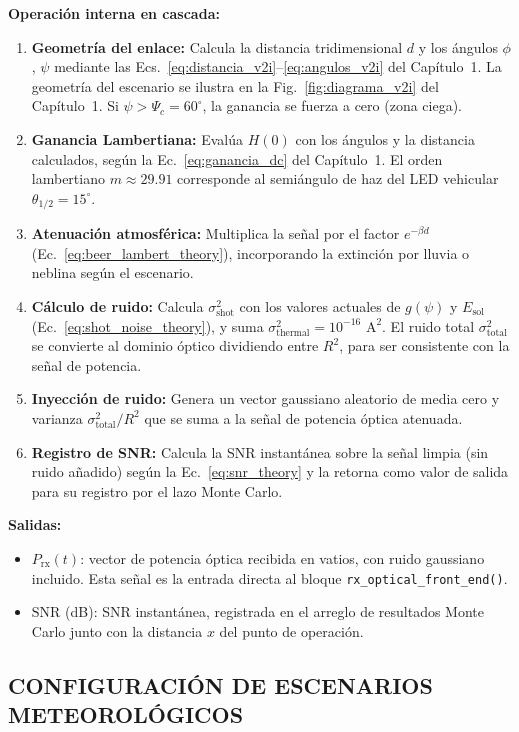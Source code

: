 \textbf{Operación interna en cascada:}
\begin{enumerate}
    \item \textbf{Geometría del enlace:} Calcula la distancia tridimensional $d$ y los ángulos $\phi$, $\psi$ mediante las Ecs.~\ref{eq:distancia_v2i}--\ref{eq:angulos_v2i} del Capítulo~1. La geometría del escenario se ilustra en la Fig.~\ref{fig:diagrama_v2i} del Capítulo~1. Si $\psi > \Psi_c = 60^\circ$, la ganancia se fuerza a cero (zona ciega).
    \item \textbf{Ganancia Lambertiana:} Evalúa $H(0)$ con los ángulos y la distancia calculados, según la Ec.~\ref{eq:ganancia_dc} del Capítulo~1. El orden lambertiano $m \approx 29.91$ corresponde al semiángulo de haz del LED vehicular $\theta_{1/2} = 15^\circ$.
    \item \textbf{Atenuación atmosférica:} Multiplica la señal por el factor $e^{-\beta d}$ (Ec.~\ref{eq:beer_lambert_theory}), incorporando la extinción por lluvia o neblina según el escenario.
    \item \textbf{Cálculo de ruido:} Calcula $\sigma^2_{\text{shot}}$ con los valores actuales de $g(\psi)$ y $E_{\text{sol}}$ (Ec.~\ref{eq:shot_noise_theory}), y suma $\sigma^2_{\text{thermal}} = 10^{-16}\text{ A}^2$. El ruido total $\sigma^2_{\text{total}}$ se convierte al dominio óptico dividiendo entre $R^2$, para ser consistente con la señal de potencia.
    \item \textbf{Inyección de ruido:} Genera un vector gaussiano aleatorio de media cero y varianza $\sigma^2_{\text{total}}/R^2$ que se suma a la señal de potencia óptica atenuada.
    \item \textbf{Registro de SNR:} Calcula la SNR instantánea sobre la señal limpia (sin ruido añadido) según la Ec.~\ref{eq:snr_theory} y la retorna como valor de salida para su registro por el lazo Monte Carlo.
\end{enumerate}

\textbf{Salidas:}
\begin{itemize}
    \item $P_{\text{rx}}(t)$: vector de potencia óptica recibida en vatios, con ruido gaussiano incluido. Esta señal es la entrada directa al bloque \texttt{rx\_optical\_front\_end()}.
    \item $\text{SNR}$ (dB): SNR instantánea, registrada en el arreglo de resultados Monte Carlo junto con la distancia $x$ del punto de operación.
\end{itemize}

\subsection{CONFIGURACIÓN DE ESCENARIOS METEOROLÓGICOS}

